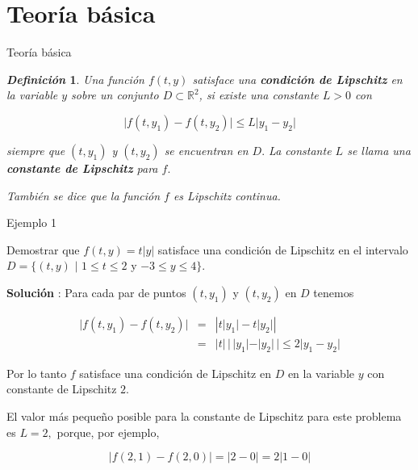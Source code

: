 \documentclass{beamer}
\newtheorem{defi}{\textit{\textbf{Definici\'on}}}
\begin{document}
\section{Teoría básica}

\begin{frame}{Teoría básica}

	\begin{defi}
		Una funci\'on $ f (t, y) $ satisface una \textbf{condici\'on de Lipschitz} en la variable $y$ sobre un conjunto $ D \subset \mathbb{R}^2 $, 
		si existe una constante $ L > 0 $ con

	
	\begin{displaymath}
	\vert f (t, y_1) - f (t, y_2)\vert \leq L \vert y_1 - y_2 \vert
	\end{displaymath}
	
	siempre que $ (t, y_1) $ y $ (t, y_2) $ se encuentran en $ D. $ La constante $ L $ se llama una \textbf{constante de Lipschitz} para $ f. $ 
	
	\strut
	
	También se dice que la función $f$ es Lipschitz continua.
	\end{defi}

\end{frame}

\begin{frame}{Ejemplo 1}
	
	\begin{block}{}
		Demostrar que $ f (t, y) = t \vert y \vert $ satisface una condici\'on de Lipschitz en el intervalo $ D = \{(t, y) \,\, \vert \,\, 1 \leq t \leq 2 $ y $ -3 \leq  y \leq 4 \}. $
	\end{block}	
	
	\pause
		
		\textbf{Soluci\'on} : Para cada par de puntos $(t, y_1)$ y $(t, y_2)$ en $D$ tenemos
		
		\begin{eqnarray*}
			\vert f (t, y_1) - f (t, y_2) \vert & = &
			\left\vert t \vert y_1 \vert - t \vert y_2 \vert \right\vert \\
			& = & \vert t \vert \, \vert \, \vert y_1 \vert - \vert y_2 \vert \, \vert \leq 2 \vert y_1 - y_2 \vert
		\end{eqnarray*}
	
	\pause
		
		Por lo tanto $ f $ satisface una condici\'on de Lipschitz en $ D $ en la variable $y$ con constante de Lipschitz $2$. 
	
	\pause
		
		El valor m\'as peque\~no posible para la constante de Lipschitz para este problema es $ L = 2, $ porque, por ejemplo,
		
		\begin{displaymath}
		\vert f (2, 1) - f (2, 0) \vert = \vert 2 - 0 \vert = 2 \vert 1 - 0 \vert
		\end{displaymath}

	
\end{frame}
\end{document}
